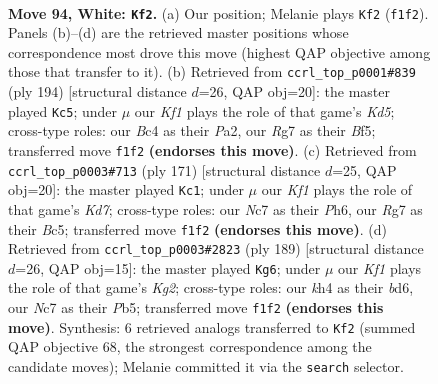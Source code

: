 \documentclass[11pt]{article}
\begin{document}
\clearpage

\begin{figure}[p]\centering
\begin{subfigure}{0.46\textwidth}\centering
\resizebox{\linewidth}{!}{%
\newchessgame
\chessboard[
  setfen={8/2N3R1/5P2/8/npB1b1Pk/8/8/5K2 w - - 1 94},
  showmover=false,
  pgfstyle=straightmove, color=movearrow, markmove={f1-f2}
]}
\caption{}
\end{subfigure}\hfill
\begin{subfigure}{0.46\textwidth}\centering
\resizebox{\linewidth}{!}{%
\newchessgame
\chessboard[
  setfen={1b5k/7P/5p2/3K1B2/1p6/8/P7/8 w - - 4 98},
  showmover=false,
  pgfstyle=straightmove, color=movearrow, markmove={d5-c5}
]}
\caption{}
\end{subfigure}
\\[4pt]
\begin{subfigure}{0.46\textwidth}\centering
\resizebox{\linewidth}{!}{%
\newchessgame
\chessboard[
  setfen={8/8/7p/2b2B1P/5p2/p7/K2k2P1/8 b - - 53 86},
  showmover=false,
  pgfstyle=straightmove, color=movearrow, markmove={d2-c1}
]}
\caption{}
\end{subfigure}\hfill
\begin{subfigure}{0.46\textwidth}\centering
\resizebox{\linewidth}{!}{%
\newchessgame
\chessboard[
  setfen={8/6k1/3Bp3/1p2p3/8/5K2/2R5/4r3 b - - 2 95},
  showmover=false,
  pgfstyle=straightmove, color=movearrow, markmove={g7-g6}
]}
\caption{}
\end{subfigure}
\caption{\textbf{Move 94, White: \texttt{Kf2}.} (a) Our position; Melanie plays \texttt{Kf2} (\texttt{f1f2}). Panels (b)--(d) are the retrieved master positions whose correspondence most drove this move (highest QAP objective among those that transfer to it). (b) Retrieved from \texttt{ccrl\_top\_p0001\#839} (ply 194) [structural distance $d$=26, QAP obj=20]: the master played \texttt{Kc5}; under $\mu$ our \emph{Kf1} plays the role of that game's \emph{Kd5}; cross-type roles: our \emph{B}c4 as their \emph{P}a2, our \emph{R}g7 as their \emph{B}f5; transferred move \texttt{f1f2} \textbf{(endorses this move)}. (c) Retrieved from \texttt{ccrl\_top\_p0003\#713} (ply 171) [structural distance $d$=25, QAP obj=20]: the master played \texttt{Kc1}; under $\mu$ our \emph{Kf1} plays the role of that game's \emph{Kd7}; cross-type roles: our \emph{N}c7 as their \emph{P}h6, our \emph{R}g7 as their \emph{B}c5; transferred move \texttt{f1f2} \textbf{(endorses this move)}. (d) Retrieved from \texttt{ccrl\_top\_p0003\#2823} (ply 189) [structural distance $d$=26, QAP obj=15]: the master played \texttt{Kg6}; under $\mu$ our \emph{Kf1} plays the role of that game's \emph{Kg2}; cross-type roles: our \emph{k}h4 as their \emph{b}d6, our \emph{N}c7 as their \emph{P}b5; transferred move \texttt{f1f2} \textbf{(endorses this move)}. Synthesis: 6 retrieved analogs transferred to \texttt{Kf2} (summed QAP objective 68, the strongest correspondence among the candidate moves); Melanie committed it via the \texttt{search} selector.}
\label{fig:thought-m186}
\end{figure}
\end{document}
